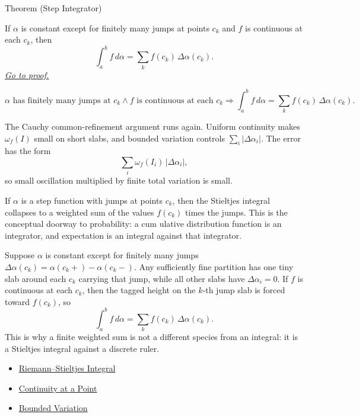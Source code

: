\begin{theorembox}{Theorem (Step Integrator)}
\begin{theorem}
\label{thm:rs-step-integrator-finite-sum}
If \(\alpha\) is constant except for finitely many jumps at points \(c_k\) and
\(f\) is continuous at each \(c_k\), then
\[
  \int_a^b f\,d\alpha=\sum_k f(c_k)\,\Delta\alpha(c_k).
\]
\hyperref[prf:rs-step-integrator-finite-sum]{\textit{Go to proof.}}
\end{theorem}
\end{theorembox}

\begin{remark*}
\[
\alpha\text{ has finitely many jumps at }c_k
\land
f\text{ is continuous at each }c_k
\Longrightarrow
\int_a^b f\,d\alpha=\sum_k f(c_k)\,\Delta\alpha(c_k).
\]
\end{remark*}

\begin{remark*}[Interpretation]
The Cauchy common-refinement argument runs again. Uniform continuity makes
\(\omega_f(I)\) small on short slabs, and bounded variation controls
\(\sum_i|\Delta\alpha_i|\). The error has the form
\[
  \sum_i \omega_f(I_i)\,|\Delta\alpha_i|,
\]
so small oscillation multiplied by finite total variation is small.


If \(\alpha\) is a step function with jumps at points \(c_k\), then the
Stieltjes integral collapses to a weighted sum of the values \(f(c_k)\) times
the jumps. This is the conceptual doorway to probability: a cum
ulative
distribution function is an integrator, and expectation is an integral against
that integrator.


Suppose \(\alpha\) is constant except for finitely many jumps
\(\Delta\alpha(c_k)=\alpha(c_k+)-\alpha(c_k-)\). Any sufficiently fine
partition has one tiny slab around each \(c_k\) carrying that jump, while all
other slabs have \(\Delta\alpha_i=0\). If \(f\) is continuous at each \(c_k\),
then the tagged height on the \(k\)-th jump slab is forced toward \(f(c_k)\),
so
\[
  \int_a^b f\,d\alpha=\sum_k f(c_k)\,\Delta\alpha(c_k).
\]
This is why a finite weighted sum is not a different species from an integral:
it is a Stieltjes integral against a discrete ruler.
\end{remark*}

\begin{dependencies}
\begin{itemize}
  \item \hyperref[def:riemann-stieltjes-integral]{Riemann--Stieltjes Integral}
  \item \hyperref[def:continuous-at-point]{Continuity at a Point}
  \item \hyperref[def:bounded-variation-integration]{Bounded Variation}
\end{itemize}
\end{dependencies}

